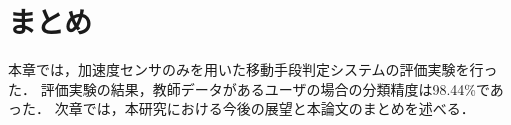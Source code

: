 



\section{まとめ}
本章では，加速度センサのみを用いた移動手段判定システムの評価実験を行った．
評価実験の結果，教師データがあるユーザの場合の分類精度は98.44\%であった．
次章では，本研究における今後の展望と本論文のまとめを述べる．